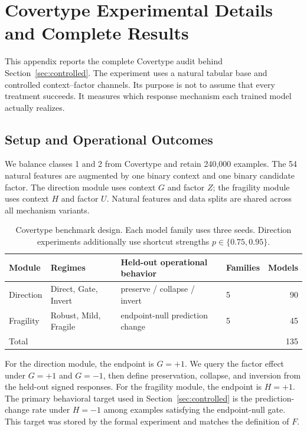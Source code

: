 
\section{Covertype Experimental Details and Complete Results}
\label{app:covertype-transfer}

This appendix reports the complete Covertype audit behind Section~\ref{sec:controlled}. The experiment uses a natural tabular base and controlled context--factor channels. Its purpose is not to assume that every treatment succeeds. It measures which response mechanism each trained model actually realizes.

\subsection{Setup and Operational Outcomes}
\label{app:covertype-setup}

We balance classes 1 and 2 from Covertype and retain 240,000 examples. The 54 natural features are augmented by one binary context and one binary candidate factor. The direction module uses context $G$ and factor $Z$; the fragility module uses context $H$ and factor $U$. Natural features and data splits are shared across all mechanism variants.

\begin{table}[t]
\centering
\caption{Covertype benchmark design. Each model family uses three seeds. Direction experiments additionally use shortcut strengths $p\in\{0.75,0.95\}$.}
\label{tab:covertype-setup}
\small
\begin{tabular}{llllr}
\toprule
Module & Regimes & Held-out operational behavior & Families & Models \\
\midrule
Direction & Direct, Gate, Invert & preserve / collapse / invert & 5 & 90 \\
Fragility & Robust, Mild, Fragile & endpoint-null prediction change & 5 & 45 \\
\midrule
Total & & & & 135 \\
\bottomrule
\end{tabular}
\end{table}

For the direction module, the endpoint is $G=+1$. We query the factor effect under $G=+1$ and $G=-1$, then define preservation, collapse, and inversion from the held-out signed responses. For the fragility module, the endpoint is $H=+1$. The primary behavioral target used in Section~\ref{sec:controlled} is the prediction-change rate under $H=-1$ among examples satisfying the endpoint-null gate. This target was stored by the formal experiment and matches the definition of $F$.

